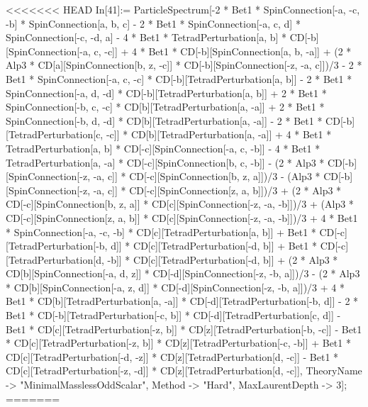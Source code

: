 <<<<<<< HEAD
In[41]:= ParticleSpectrum[-2 * Bet1 * SpinConnection[-a, -c, -b] * SpinConnection[a, b, c] - 2 * Bet1 * SpinConnection[-a, c, d] * SpinConnection[-c, -d, a] - 4 * Bet1 * TetradPerturbation[a, b] * CD[-b][SpinConnection[-a, c, -c]] + 4 * Bet1 * CD[-b][SpinConnection[a, b, -a]] + (2 * Alp3 * CD[a][SpinConnection[b, z, -c]] * CD[-b][SpinConnection[-z, -a, c]])/3 - 2 * Bet1 * SpinConnection[-a, c, -c] * CD[-b][TetradPerturbation[a, b]] - 2 * Bet1 * SpinConnection[-a, d, -d] * CD[-b][TetradPerturbation[a, b]] + 2 * Bet1 * SpinConnection[-b, c, -c] * CD[b][TetradPerturbation[a, -a]] + 2 * Bet1 * SpinConnection[-b, d, -d] * CD[b][TetradPerturbation[a, -a]] - 2 * Bet1 * CD[-b][TetradPerturbation[c, -c]] * CD[b][TetradPerturbation[a, -a]] + 4 * Bet1 * TetradPerturbation[a, b] * CD[-c][SpinConnection[-a, c, -b]] - 4 * Bet1 * TetradPerturbation[a, -a] * CD[-c][SpinConnection[b, c, -b]] - (2 * Alp3 * CD[-b][SpinConnection[-z, -a, c]] * CD[-c][SpinConnection[b, z, a]])/3 - (Alp3 * CD[-b][SpinConnection[-z, -a, c]] * CD[-c][SpinConnection[z, a, b]])/3 + (2 * Alp3 * CD[-c][SpinConnection[b, z, a]] * CD[c][SpinConnection[-z, -a, -b]])/3 + (Alp3 * CD[-c][SpinConnection[z, a, b]] * CD[c][SpinConnection[-z, -a, -b]])/3 + 4 * Bet1 * SpinConnection[-a, -c, -b] * CD[c][TetradPerturbation[a, b]] + Bet1 * CD[-c][TetradPerturbation[-b, d]] * CD[c][TetradPerturbation[-d, b]] + Bet1 * CD[-c][TetradPerturbation[d, -b]] * CD[c][TetradPerturbation[-d, b]] + (2 * Alp3 * CD[b][SpinConnection[-a, d, z]] * CD[-d][SpinConnection[-z, -b, a]])/3 - (2 * Alp3 * CD[b][SpinConnection[-a, z, d]] * CD[-d][SpinConnection[-z, -b, a]])/3 + 4 * Bet1 * CD[b][TetradPerturbation[a, -a]] * CD[-d][TetradPerturbation[-b, d]] - 2 * Bet1 * CD[-b][TetradPerturbation[-c, b]] * CD[-d][TetradPerturbation[c, d]] - Bet1 * CD[c][TetradPerturbation[-z, b]] * CD[z][TetradPerturbation[-b, -c]] - Bet1 * CD[c][TetradPerturbation[-z, b]] * CD[z][TetradPerturbation[-c, -b]] + Bet1 * CD[c][TetradPerturbation[-d, -z]] * CD[z][TetradPerturbation[d, -c]] - Bet1 * CD[c][TetradPerturbation[-z, -d]] * CD[z][TetradPerturbation[d, -c]], TheoryName -> "MinimalMasslessOddScalar", Method -> "Hard", MaxLaurentDepth -> 3]; 
=======
